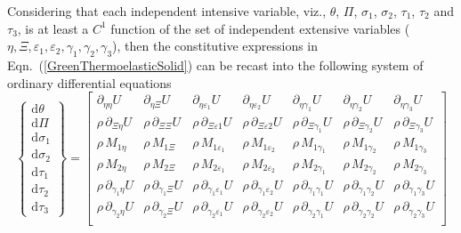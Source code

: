 Considering that each independent intensive variable, viz., $\theta$, $\Pi$, $\sigma_1$, $\sigma_2$, $\tau_1$, $\tau_2$ and $\tau_3$, is at least a $C^1$ function of the set of independent extensive variables ($\eta , \Xi , \varepsilon_1 , \varepsilon_2 , \gamma_1 , \gamma_2 , \gamma_3 $), then the constitutive expressions in Eqn.~(\ref{GreenThermoelasticSolid}) can be recast into the following system of ordinary differential equations
\begin{equation}
\left\{ \begin{matrix}
\mathrm{d} \theta \\ \mathrm{d} \Pi \\
\mathrm{d} \sigma_1 \\ \mathrm{d} \sigma_2 \\ 
\mathrm{d} \tau_1 \\ \mathrm{d} \tau_2 \\ \mathrm{d} \tau_3
\end{matrix} \right\} = \begin{bmatrix}
\partial_{\eta\eta} U & 
\partial_{\eta\Xi} U & 
\partial_{\eta\varepsilon_1} U & 
\partial_{\eta\varepsilon_2} U &
\partial_{\eta\gamma_1} U &
\partial_{\eta\gamma_2} U &
\partial_{\eta\gamma_3} U \\ 
\rho \, \partial_{\Xi\eta} U & 
\rho \, \partial_{\Xi\Xi} U & 
\rho \, \partial_{\Xi\varepsilon1} U &
\rho \, \partial_{\Xi\varepsilon2} U &
\rho \, \partial_{\Xi\gamma_1} U &
\rho \, \partial_{\Xi\gamma_2} U &
\rho \, \partial_{\Xi\gamma_3} U \\
\rho \, M_{1\eta} & 
\rho \, M_{1\Xi} & 
\rho \, M_{1\varepsilon_1} & 
\rho \, M_{1\varepsilon_2} &
\rho \, M_{1\gamma_1} &
\rho \, M_{1\gamma_2} &
\rho \, M_{1\gamma_3} \\
\rho \, M_{2\eta} & 
\rho \, M_{2\Xi} & 
\rho \, M_{2\varepsilon_1} & 
\rho \, M_{2\varepsilon_2} &
\rho \, M_{2\gamma_1} &
\rho \, M_{2\gamma_2} &
\rho \, M_{2\gamma_3} \\
\rho \, \partial_{\gamma_1\eta} U & 
\rho \, \partial_{\gamma_1\Xi} U & 
\rho \, \partial_{\gamma_1\varepsilon_1} U & 
\rho \, \partial_{\gamma_1\varepsilon_2} U &
\rho \, \partial_{\gamma_1\gamma_1} U  &
\rho \, \partial_{\gamma_1\gamma_2} U &
\rho \, \partial_{\gamma_1\gamma_3} U \\
\rho \, \partial_{\gamma_2\eta} U & 
\rho \, \partial_{\gamma_2\Xi} U & 
\rho \, \partial_{\gamma_2\varepsilon_1} U & 
\rho \, \partial_{\gamma_2\varepsilon_2} U &
\rho \, \partial_{\gamma_2\gamma_1} U  &
\rho \, \partial_{\gamma_2\gamma_2} U &
\rho \, \partial_{\gamma_2\gamma_3} U \\

\end{bmatrix}
\end{equation}
